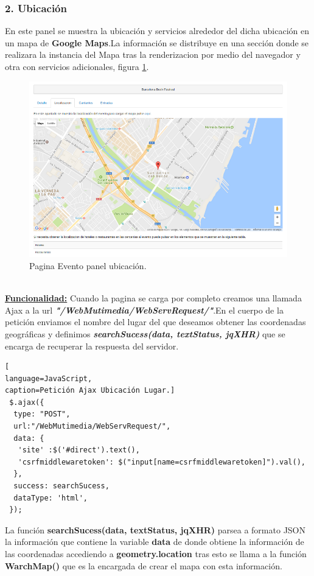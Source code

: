 \subsubsection*{2. Ubicación}
En este panel se muestra la ubicación y servicios alrededor del dicha ubicación en un mapa de \textbf{Google Maps}.La información se distribuye en una sección donde se realizara la instancia del Mapa tras la renderizacion por medio del navegador y otra con servicios adicionales,  figura \ref{fig:Ubicacion_Evento}.
\begin{figure}[!h]
\begin{center}
   \includegraphics[width=0.6\linewidth]{Figures/Ubicacion_Evento}
	\decoRule
	\caption[ Evento panel ubicación]{Pagina Evento panel ubicación.}
\label{fig:Ubicacion_Evento}
\end{center}
\end{figure}
\\\underline{\textbf{Funcionalidad:}} Cuando la pagina se carga por completo creamos una llamada Ajax a la url \textit{\textbf{ "/WebMutimedia/WebServRequest/"}}.En el cuerpo de la petición enviamos el nombre del lugar del que deseamos obtener las coordenadas geográficas y definimos \textit{\textbf{searchSucess(data, textStatus, jqXHR)}} que se encarga de recuperar la respuesta del servidor.
\begin{lstlisting}[
language=JavaScript,
caption=Petición Ajax Ubicación Lugar.]
 $.ajax({ 
  type: "POST",
  url:"/WebMutimedia/WebServRequest/",
  data: {
   'site' :$('#direct').text(),
   'csrfmiddlewaretoken': $("input[name=csrfmiddlewaretoken]").val(),
  },
  success: searchSucess,
  dataType: 'html',
 });
\end{lstlisting}
La función \textbf{searchSucess(data, textStatus, jqXHR)} parsea a formato JSON la información que contiene la variable \textbf{data} de donde obtiene la información de las coordenadas accediendo a \textbf{geometry.location} tras esto se llama a la función \textbf{ WarchMap()} que es la encargada de crear el mapa con esta información.
